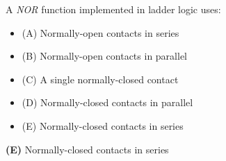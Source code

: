 

A {\it NOR} function implemented in ladder logic uses:

\begin{itemize}
\item{(A)} Normally-open contacts in series
\vskip 5pt 
\item{(B)} Normally-open contacts in parallel
\vskip 5pt 
\item{(C)} A single normally-closed contact
\vskip 5pt 
\item{(D)} Normally-closed contacts in parallel
\vskip 5pt 
\item{(E)} Normally-closed contacts in series
\end{itemize}







{\bf (E)} Normally-closed contacts in series
 










